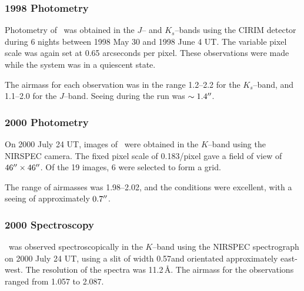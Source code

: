\subsubsection{1998 Photometry}
\label{cha:GROJ1655-40:sec:ObservationsOfJ1655:subsec:DetailsOfTheObservations:subsubsec:1998Photometry}

Photometry of \groj\ was obtained in the $J$-- and $K_s$--bands using
the CIRIM detector during 6 nights between 1998 May 30 and 1998 June 4
UT. The variable pixel scale was again set at 0.65 arcseconds per pixel. These observations were made while the system was in a quiescent state. %

\vspace{\myparskip}

The airmass for each observation was in the range 1.2--2.2 for the
$K_s$--band, and 1.1--2.0 for the $J$--band. Seeing during the run was $\sim 1.4\hbox{$^{\prime\prime}$}$. %

\subsubsection{2000 Photometry}
\label{cha:GROJ1655-40:sec:ObservationsOfJ1655:subsec:DetailsOfTheObservations:subsubsec:2000Photometry}

On 2000 July 24 UT, images of \groj\ were obtained in the $K$--band
using the NIRSPEC camera.  The fixed pixel scale of 0.183\arcsec/pixel
gave a field of view of $46\hbox{$^{\prime\prime}$}\times46\hbox{$^{\prime\prime}$}$. Of the 19 images,
6 were selected to form a grid. %

\vspace{\myparskip}

The range of airmasses was 1.98--2.02, and the conditions were
excellent, with a seeing of approximately $0.7\hbox{$^{\prime\prime}$}$. %

\subsubsection{2000 Spectroscopy}
\label{cha:GROJ1655-40:sec:ObservationsOfJ1655:subsec:DetailsOfTheObservations:subsubsec:2000Spectroscopy}

\groj\ was observed spectroscopically in the $K$--band using the NIRSPEC
spectrograph on 2000 July 24 UT, using a slit of width 0.57\arcsec and
orientated approximately east-west. The resolution of the spectra was
11.2\,\AA. The airmass for the observations ranged from 1.057 to
2.087. %

\vspace{\myparskip}

